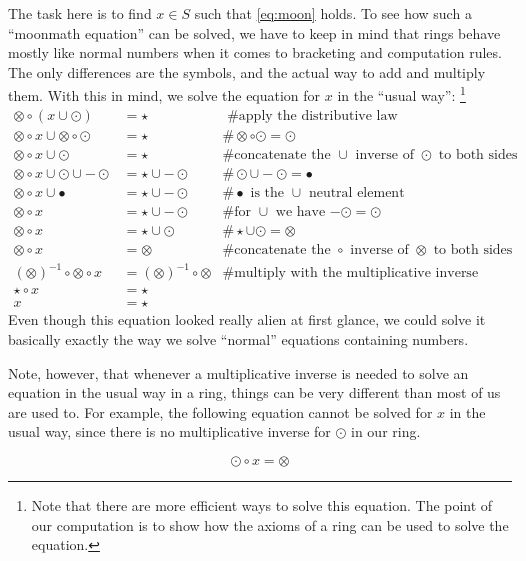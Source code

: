 \begin{example}
The task here is to find $x\in S$ such that \eqref{eq:moon} holds. To see how such a ``moonmath equation'' can be solved, we have to keep in mind that rings behave mostly like normal numbers when it comes to bracketing and computation rules. The only differences are the symbols, and the actual way to add and multiply them. With this in mind, we solve the equation for $x$ in the ``usual way'': \footnote{Note that there are more efficient ways to solve this equation. The point of our computation is to show how the axioms of a ring can be used to solve the equation.}
\begin{align*}
\otimes \circ (x \cup \odot ) &= \star & \text{ \# apply the distributive law}\\
\otimes \circ x \cup \otimes \circ \odot  &= \star &\# \otimes \circ \odot = \odot\\
\otimes \circ x \cup \odot  &= \star & \text{\# concatenate the $\cup$ inverse of $\odot$ to both sides}\\
\otimes \circ x \cup \odot \cup -\odot  &= \star \cup -\odot & \# \odot \cup -\odot = \bullet\\
\otimes \circ x \cup \bullet &= \star \cup -\odot & \text{\# $\bullet$ is the $\cup$ neutral element}\\
\otimes \circ x &= \star \cup -\odot & \text{\# for $\cup$ we have $-\odot = \odot$} \\
\otimes \circ x &= \star \cup \odot &\# \star \cup \odot = \otimes \\
\otimes \circ x &= \otimes  &\text{\# concatenate the $\circ$ inverse of $\otimes$ to both sides}\\
(\otimes)^{-1}\circ \otimes \circ x &= (\otimes)^{-1}\circ \otimes & \text{\# multiply with the multiplicative inverse}\\
\star \circ x &= \star\\
x &= \star
\end{align*}
Even though this equation looked really alien at first glance, we could solve it basically exactly the way we solve ``normal'' equations containing numbers.

Note, however, that whenever a multiplicative inverse is needed to solve an equation in the usual way in a ring, things can be very different than most of us are used to.  For example, the following equation cannot be solved for $x$ in the usual way, since there is no multiplicative inverse for $\odot$ in our ring.

\begin{equation}
\odot \circ x = \otimes
\end{equation}


\end{example}
